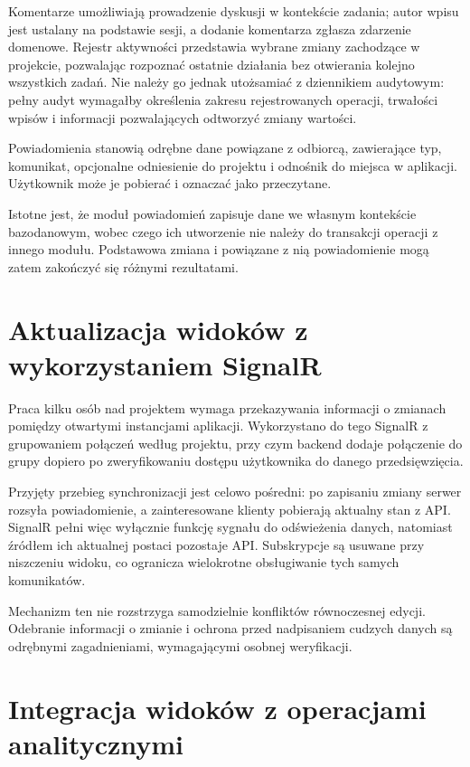 Komentarze umożliwiają prowadzenie dyskusji w kontekście zadania; autor wpisu jest ustalany na podstawie sesji, a dodanie komentarza zgłasza zdarzenie domenowe. Rejestr aktywności przedstawia wybrane zmiany zachodzące w projekcie, pozwalając rozpoznać ostatnie działania bez otwierania kolejno wszystkich zadań. Nie należy go jednak utożsamiać z dziennikiem audytowym: pełny audyt wymagałby określenia zakresu rejestrowanych operacji, trwałości wpisów i informacji pozwalających odtworzyć zmiany wartości.

Powiadomienia stanowią odrębne dane powiązane z odbiorcą, zawierające typ, komunikat, opcjonalne odniesienie do projektu i odnośnik do miejsca w aplikacji. Użytkownik może je pobierać i oznaczać jako przeczytane.

Istotne jest, że moduł powiadomień zapisuje dane we własnym kontekście bazodanowym, wobec czego ich utworzenie nie należy do transakcji operacji z innego modułu. Podstawowa zmiana i powiązane z nią powiadomienie mogą zatem zakończyć się różnymi rezultatami.

\section{Aktualizacja widoków z wykorzystaniem SignalR}

Praca kilku osób nad projektem wymaga przekazywania informacji o zmianach pomiędzy otwartymi instancjami aplikacji. Wykorzystano do tego SignalR z grupowaniem połączeń według projektu, przy czym backend dodaje połączenie do grupy dopiero po zweryfikowaniu dostępu użytkownika do danego przedsięwzięcia.

Przyjęty przebieg synchronizacji jest celowo pośredni: po zapisaniu zmiany serwer rozsyła powiadomienie, a zainteresowane klienty pobierają aktualny stan z API. SignalR pełni więc wyłącznie funkcję sygnału do odświeżenia danych, natomiast źródłem ich aktualnej postaci pozostaje API. Subskrypcje są usuwane przy niszczeniu widoku, co ogranicza wielokrotne obsługiwanie tych samych komunikatów.

Mechanizm ten nie rozstrzyga samodzielnie konfliktów równoczesnej edycji. Odebranie informacji o zmianie i ochrona przed nadpisaniem cudzych danych są odrębnymi zagadnieniami, wymagającymi osobnej weryfikacji.

\section{Integracja widoków z operacjami analitycznymi}

